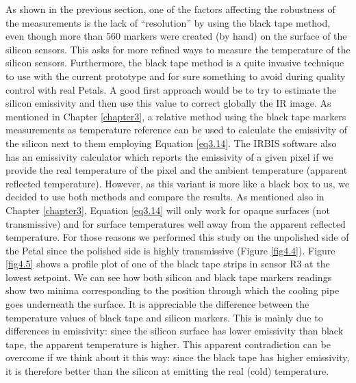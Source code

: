 		As shown in the previous section, one of the factors affecting the robustness of the measurements is the lack of “resolution” by using the black tape method, even though more than 560 markers were created (by hand) on the surface of the silicon sensors. This asks for more refined ways to measure the temperature of the silicon sensors. Furthermore, the black tape method is a quite invasive technique to use with the current prototype and for sure something to avoid during quality control with real Petals.
		A good first approach would be to try to estimate the silicon emissivity and then use this value to correct globally the IR image. As mentioned in Chapter \ref{chapter3}, a relative method using the black tape markers measurements as temperature reference can be used to calculate the emissivity of the silicon next to them employing Equation \ref{eq3.14}. The IRBIS software also has an emissivity calculator which reports the emissivity of a given pixel if we provide the real temperature of the pixel and the ambient temperature (apparent reflected temperature). However, as this variant is more like a black box to us, we decided to use both methods and compare the results. As mentioned also in Chapter \ref{chapter3}, Equation \ref{eq3.14} will only work for opaque surfaces (not transmissive) and for surface temperatures well away from the apparent reflected temperature. For those reasons we performed this study on the unpolished side of the Petal since the polished side is highly transmissive (Figure \ref{fig4.4}).
		Figure \ref{fig4.5} shows a profile plot of one of the black tape strips in sensor R3 at the lowest setpoint. We can see how both silicon and black tape markers readings show two minima corresponding to the position through which the cooling pipe goes underneath the surface. It is appreciable the difference between the temperature values of black tape and silicon markers. This is mainly due to differences in emissivity: since the silicon surface has lower emissivity than black tape, the apparent temperature is higher. This apparent contradiction can be overcome if we think about it this way: since the black tape has higher emissivity, it is therefore better than the silicon at emitting the real (cold) temperature. 
		
